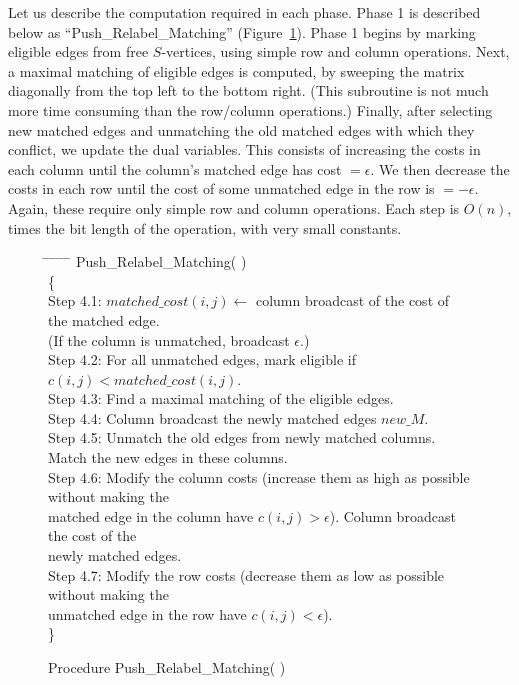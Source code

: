 Let us describe the computation required in each phase.  
Phase 1 is described below as ``Push\_Relabel\_Matching''
(Figure~\ref{push_relabel_matching}).
Phase 1 begins by marking eligible edges from free $S$-vertices, using 
simple row and column operations.  Next, a maximal matching of 
eligible edges is computed, by sweeping the matrix diagonally from the 
top left to the bottom right.  (This subroutine is not much more 
time consuming than the row/column operations.)  Finally, 
after selecting new matched edges and unmatching the old 
matched edges with which they conflict, we update the dual variables.  
This consists of increasing the costs in each column until the 
column's matched edge has cost  $= \epsilon$.  We then decrease the 
costs in each row until the cost of some unmatched edge in the row 
is $= - \epsilon$. Again, these require only simple row and column 
operations.  Each step is $O(n)$, times the bit length of 
the operation, with very small constants.

\begin{figure}
\begin{tabbing}
\hspace*{.25in} \= \hspace*{.25in} \= \hspace*{.25in} \= \hspace*{.25in} \= \hspace*{.25in} \= \hspace*{.25in} \=  \kill
Push\_Relabel\_Matching( ) \\
\{ \\
\> Step 4.1: \> \> \> $matched\_cost(i, j) \leftarrow$ column broadcast of the cost of the matched edge.  \\
\> \> \> \> 	(If the column is unmatched, broadcast $\epsilon$.) \\
\> Step 4.2: \> \> \> For all unmatched edges, mark eligible if %
			$c(i, j) < matched\_cost(i, j)$. \\
\> Step 4.3: \> \> \> Find a maximal matching of the eligible edges. \\
\> Step 4.4: \> \> \> Column broadcast the newly matched edges $new\_M$. \\
\> Step 4.5: \> \> \> Unmatch the old edges from newly matched columns.   \\
\> \> \> \> 		Match the new edges in these columns. \\
\> Step 4.6: \> \> \> Modify the column costs (increase them as high as %
		  possible without making  the \\
\> \> \> \> 	  matched edge in the column have $c(i, j) > \epsilon$).  Column broadcast the cost of the \\
\> \> \> \> 	newly matched edges. \\
\> Step 4.7: \> \> \> Modify the row costs (decrease them as low as possible %
		  without making the \\
\> \> \> \> 	  unmatched edge in the row have $c(i, j) <\epsilon$).\\
\} \\
\end{tabbing}
\caption{Procedure Push\_Relabel\_Matching( )}
\label{push_relabel_matching}
\end{figure}

